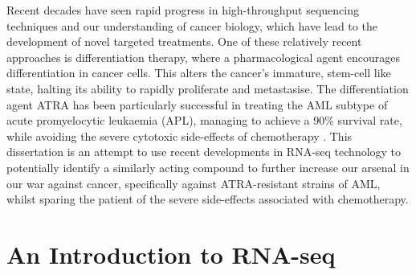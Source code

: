 Recent decades have seen rapid progress in high-throughput sequencing techniques and our understanding of cancer biology, which have lead to the development of novel targeted treatments. One of these relatively recent approaches is differentiation therapy, where a pharmacological agent encourages differentiation in cancer cells. This alters the cancer's immature, stem-cell like state, halting its ability to rapidly proliferate and metastasise. The differentiation agent \ac{ATRA} has been particularly successful in treating the \ac{AML} subtype of acute promyelocytic leukaemia (APL), managing to achieve a 90\% survival rate, while avoiding the severe cytotoxic side-effects of chemotherapy \citep{kim2015selection}. This dissertation is an attempt to use recent developments in RNA-seq technology to potentially identify a similarly acting compound to further increase our arsenal in our war against cancer, specifically against \ac{ATRA}-resistant strains of \ac{AML}, whilst sparing the patient of the severe side-effects associated with chemotherapy.


\section{An Introduction to RNA-seq}

